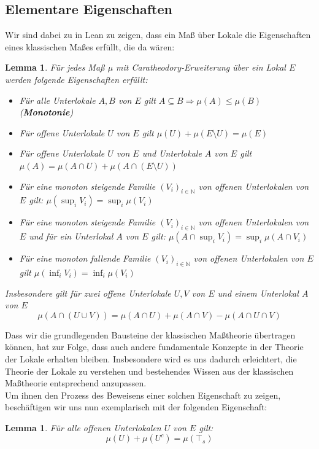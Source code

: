 \documentclass{article}
\newtheorem{lemma}[satz]{Lemma}
\begin{document}
\subsection{Elementare Eigenschaften}
Wir sind dabei zu in Lean zu zeigen, dass ein Maß über Lokale die Eigenschaften eines klassischen Maßes erfüllt, die da wären:
\begin{lemma}
Für jedes Maß $\mu$ mit Caratheodory-Erweiterung über ein Lokal $E$ werden folgende Eigenschaften erfüllt:
\begin{itemize}
    \item Für alle Unterlokale $A,B$ von $E$ gilt $A\subseteq B\Rightarrow\mu(A)\leq\mu(B)$ (\textbf{Monotonie})
    \item Für offene Unterlokale $U$ von $E$ gilt $\mu(U)+\mu(E\setminus U)=\mu(E)$
    \item Für offene Unterlokale $U$ von $E$ und Unterlokale $A$ von $E$ gilt $\mu(A)=\mu(A\cap U)+\mu(A\cap(E\setminus U))$
     \item Für eine monoton steigende Familie $(V_i)_{i\in\mathbb{N}}$ von offenen Unterlokalen von $E$ gilt: $\mu(\sup_i V_i)=\sup_i\mu(V_i)$
    \item Für eine monoton steigende Familie $(V_i)_{i\in\mathbb{N}}$ von offenen Unterlokalen von $E$ und für ein Unterlokal $A$ von $E$ gilt: $\mu(A\cap\sup_i V_i)=\sup_i\mu(A\cap V_i)$
    \item Für eine monoton fallende Familie $(V_i)_{i\in\mathbb{N}}$ von offenen Unterlokalen von $E$ gilt $\mu(\inf_i V_i)=\inf_i\mu(V_i)$
\end{itemize}
Insbesondere gilt für zwei offene Unterlokale $U, V$ von $E$ und einem Unterlokal $A$ von $E$
\[
\mu(A\cap(U\cup V))=\mu(A\cap U)+\mu(A\cap V)-\mu(A\cap U\cap V)
\]
\end{lemma}
\noindent Dass wir die grundlegenden Bausteine der klassischen Maßtheorie übertragen können, hat zur Folge, dass auch andere fundamentale Konzepte in der Theorie der Lokale erhalten bleiben. Insbesondere wird es uns dadurch erleichtert, die Theorie der Lokale zu verstehen und bestehendes Wissen aus der klassischen Maßtheorie entsprechend anzupassen.\\
Um ihnen den Prozess des Beweisens einer solchen Eigenschaft zu zeigen, beschäftigen wir uns nun exemplarisch mit der folgenden Eigenschaft:
\begin{lemma}
    Für alle offenen Unterlokalen $U$ von $E$ gilt: 
    $$\mu(U) + \mu(U^c) = \mu(\top_s)$$ %
\end{lemma}
\end{document}
